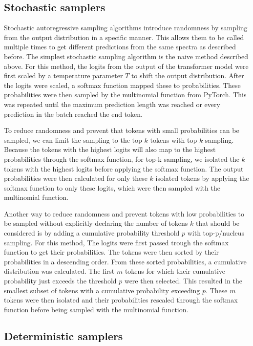 \subsection{Stochastic samplers}

Stochastic autoregressive sampling algorithms introduce randomness by sampling from the output distribution in a specific manner.
This allows them to be called multiple times to get different predictions from the same spectra as described before.
The simplest stochastic sampling algorithm is the naive method described above.
For this method, the logits from the output of the transformer model were first scaled by a temperature parameter $T$ to shift the output distribution.
After the logits were scaled, a softmax function mapped these to probabilities.
These probabilities were then sampled by the multinomial function from PyTorch.
This was repeated until the maximum prediction length was reached or every prediction in the batch reached the end token.

To reduce randomness and prevent that tokens with small probabilities can be sampled, we can limit the sampling to the top-$k$ tokens with top-$k$ sampling.
Because the tokens with the highest logits will also map to the highest probabilities through the softmax function,
for top-k sampling, we isolated the $k$ tokens with the highest logits before applying the softmax function.
The output probabilities were then calculated for only these $k$ isolated tokens by applying the softmax function to only these logits, which were then sampled with the multinomial function.

Another way to reduce randomness and prevent tokens with low probabilities to be sampled without explicitly declaring the number of tokens $k$ that should be considered is by adding a cumulative probability threshold $p$ with top-p/nucleus sampling.
For this method, The logits were first passed trough the softmax function to get their probabilities.
The tokens were then sorted by their probabilities in a descending order.
From these sorted probabilities, a cumulative distribution was calculated.
The first $m$ tokens for which their cumulative probability just exceeds the threshold $p$ were then selected.
This resulted in the smallest subset of tokens with a cumulative probability exceeding $p$.
These $m$ tokens were then isolated and their probabilities rescaled through the softmax function before being sampled with the multinomial function.

\subsection{Deterministic samplers}

